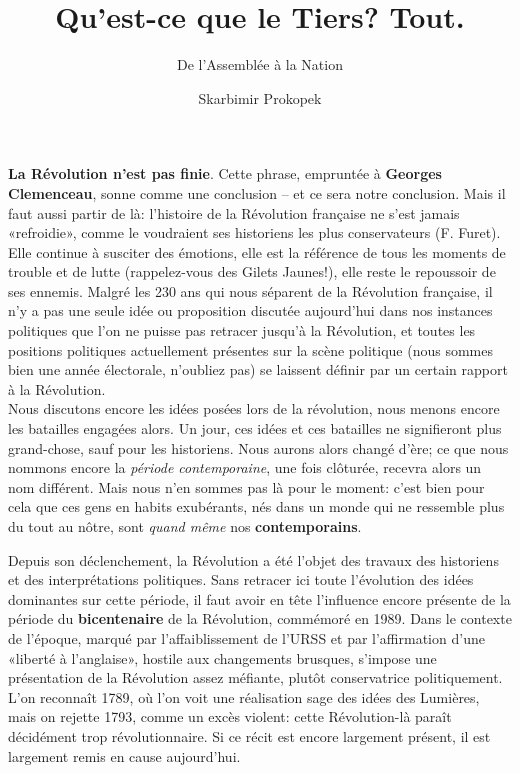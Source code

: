 \documentclass[
  french,
  letterpaper,
  DIV=11,
  numbers=noendperiod]{scrartcl}
\title{Qu'est-ce que le Tiers? Tout.}
\subtitle{De l'Assemblée à la Nation}
\author{Skarbimir Prokopek}
\date{}
\renewcommand*\contentsname{Table des matières}
\newcommand\contentsname{Table des matières}
\begin{document}
\maketitle

\renewcommand*\contentsname{Table des matières}
{
\hypersetup{linkcolor=}
\setcounter{tocdepth}{3}
\tableofcontents
}

\textbf{La Révolution n'est pas finie}. Cette phrase, empruntée à
\textbf{Georges Clemenceau}, sonne comme une conclusion -- et ce sera
notre conclusion. Mais il faut aussi partir de là: l'histoire de la
Révolution française ne s'est jamais «refroidie», comme le voudraient
ses historiens les plus conservateurs (F. Furet). Elle continue à
susciter des émotions, elle est la référence de tous les moments de
trouble et de lutte (rappelez-vous des Gilets Jaunes!), elle reste le
repoussoir de ses ennemis. Malgré les 230 ans qui nous séparent de la
Révolution française, il n'y a pas une seule idée ou proposition
discutée aujourd'hui dans nos instances politiques que l'on ne puisse
pas retracer jusqu'à la Révolution, et toutes les positions politiques
actuellement présentes sur la scène politique (nous sommes bien une
année électorale, n'oubliez pas) se laissent définir par un certain
rapport à la Révolution.\\
Nous discutons encore les idées posées lors de la révolution, nous
menons encore les batailles engagées alors. Un jour, ces idées et ces
batailles ne signifieront plus grand-chose, sauf pour les historiens.
Nous aurons alors changé d'ère; ce que nous nommons encore la
\emph{période contemporaine}, une fois clôturée, recevra alors un nom
différent. Mais nous n'en sommes pas là pour le moment: c'est bien pour
cela que ces gens en habits exubérants, nés dans un monde qui ne
ressemble plus du tout au nôtre, sont \emph{quand même} nos
\textbf{contemporains}.

Depuis son déclenchement, la Révolution a été l'objet des travaux des
historiens et des interprétations politiques. Sans retracer ici toute
l'évolution des idées dominantes sur cette période, il faut avoir en
tête l'influence encore présente de la période du \textbf{bicentenaire}
de la Révolution, commémoré en 1989. Dans le contexte de l'époque,
marqué par l'affaiblissement de l'URSS et par l'affirmation d'une
«liberté à l'anglaise», hostile aux changements brusques, s'impose une
présentation de la Révolution assez méfiante, plutôt conservatrice
politiquement. L'on reconnaît 1789, où l'on voit une réalisation sage
des idées des Lumières, mais on rejette 1793, comme un excès violent:
cette Révolution-là paraît décidément trop révolutionnaire. Si ce récit
est encore largement présent, il est largement remis en cause
aujourd'hui.
\end{document}
